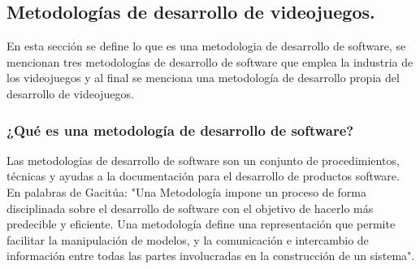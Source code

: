 \subsection{Metodologías de desarrollo de videojuegos.}\label{MetodoVideojuego}

En esta sección se define lo que es una metodologia de desarrollo de software, 
se mencionan tres metodologías de desarrollo de software que emplea la industria de los videojuegos
y al final se menciona una metodología de desarrollo propia del desarrollo de videojuegos.

\subsubsection{¿Qué es una metodología de desarrollo de software?}
Las metodologías de desarrollo de software son un conjunto de procedimientos, técnicas y ayudas a la documentación para el desarrollo de productos software\cite{Ref_metodologia}.	En palabras de Gacitúa: "Una Metodología impone un proceso de forma disciplinada sobre el desarrollo de software con el objetivo de hacerlo más predecible y eficiente. Una metodología define una representación que permite facilitar la manipulación de modelos, y la comunicación e intercambio de información entre todas las partes involucradas en la construcción de un sistema"\cite{Ref_Metod}. 


